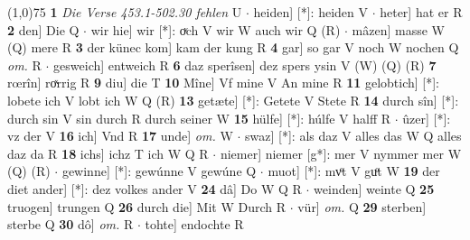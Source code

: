 \documentclass[8pt,a4paper,notitlepage]{article}
\begin{document}
\begin{table}[ht]
\begin{minipage}[t]{0.5\linewidth}
\line(1,0){75} \newline
\textbf{1} \textit{Die Verse 453.1-502.30 fehlen} U   $\cdot$ heiden] [*]: heiden V  $\cdot$ heter] hat er R \textbf{2} den] Die Q  $\cdot$ wir hie] wir [*]: oͮch V wir W auch wir Q (R)  $\cdot$ mâzen] masse W (Q) mere R \textbf{3} der künec kom] kam der kung R \textbf{4} gar] so gar V noch W nochen Q \textit{om.} R  $\cdot$ gesweich] entweich R \textbf{6} daz sperîsen] dez spers ysin V (W) (Q) (R) \textbf{7} rœrîn] roͯrrig R \textbf{9} diu] die T \textbf{10} Mîne] Vf mine V An mine R \textbf{11} gelobtich] [*]: lobete ich V lobt ich W Q (R) \textbf{13} getæte] [*]: Getete V Stete R \textbf{14} durch sîn] [*]: durch sin V sin durch R durch seiner W \textbf{15} hülfe] [*]: húlfe V halff R  $\cdot$ ûzer] [*]: vz der V \textbf{16} ich] Vnd R \textbf{17} unde] \textit{om.} W  $\cdot$ swaz] [*]: als daz V alles das W Q alles daz da R \textbf{18} ichs] ichz T ich W Q R  $\cdot$ niemer] niemer [g*]: mer V nymmer mer W (Q) (R)  $\cdot$ gewinne] [*]: gewúnne V gewúne Q  $\cdot$ muot] [*]: mvͦt V guͦt W \textbf{19} der diet ander] [*]: dez volkes ander V \textbf{24} dâ] Do W Q R  $\cdot$ weinden] weinte Q \textbf{25} truogen] trungen Q \textbf{26} durch die] Mit W Durch R  $\cdot$ vür] \textit{om.} Q \textbf{29} sterben] sterbe Q \textbf{30} dô] \textit{om.} R  $\cdot$ tohte] endochte R \newline
\end{minipage}
\end{table}
\end{document}

